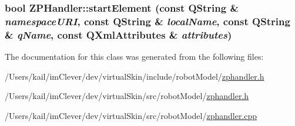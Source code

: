 \label{class_robot_model_1_1_z_p_handler_a5ed52c5d331fa5e54c41b905898fd936}
\hypertarget{class_robot_model_1_1_z_p_handler_a4041ee7deb5a59d83d6eab98101844d9}{
\subsubsection[{startElement}]{\setlength{\rightskip}{0pt plus 5cm}bool ZPHandler::startElement (const QString \& {\em namespaceURI}, \/  const QString \& {\em localName}, \/  const QString \& {\em qName}, \/  const QXmlAttributes \& {\em attributes})}}
\label{class_robot_model_1_1_z_p_handler_a4041ee7deb5a59d83d6eab98101844d9}


The documentation for this class was generated from the following files:\begin{DoxyCompactItemize}
\item 
/Users/kail/imClever/dev/virtualSkin/include/robotModel/\hyperlink{include_2robot_model_2zphandler_8h}{zphandler.h}\item 
/Users/kail/imClever/dev/virtualSkin/src/robotModel/\hyperlink{src_2robot_model_2zphandler_8h}{zphandler.h}\item 
/Users/kail/imClever/dev/virtualSkin/src/robotModel/\hyperlink{zphandler_8cpp}{zphandler.cpp}\end{DoxyCompactItemize}
